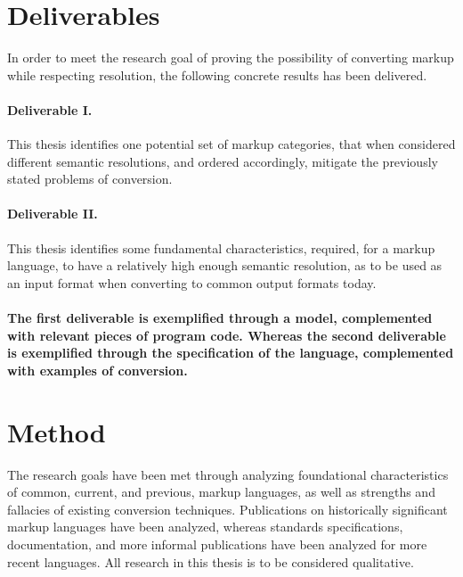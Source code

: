 \documentclass{scrreprt}
\begin{document}
\section{Deliverables}
In order to meet the research goal of proving the possibility of converting markup while respecting resolution, the following concrete results has been delivered.

\paragraph{Deliverable I.} This thesis identifies one potential set of markup categories, that when considered different semantic resolutions, and ordered accordingly, mitigate the previously stated problems of conversion.

\paragraph{Deliverable II.} This thesis identifies some fundamental characteristics, required, for a markup language, to have a relatively high enough semantic resolution, as to be used as an input format when converting to common output formats today.

\paragraph{The first deliverable is exemplified through a model, complemented with relevant pieces of program code. Whereas the second deliverable is exemplified through the specification of the language, complemented with examples of conversion.}





\section{Method}
The research goals have been met through analyzing foundational characteristics of common, current, and previous, markup languages, as well as strengths and fallacies of existing conversion techniques. Publications on historically significant markup languages have been analyzed, whereas standards specifications, documentation, and more informal publications have been analyzed for more recent languages. All research in this thesis is to be considered qualitative.
\end{document}

